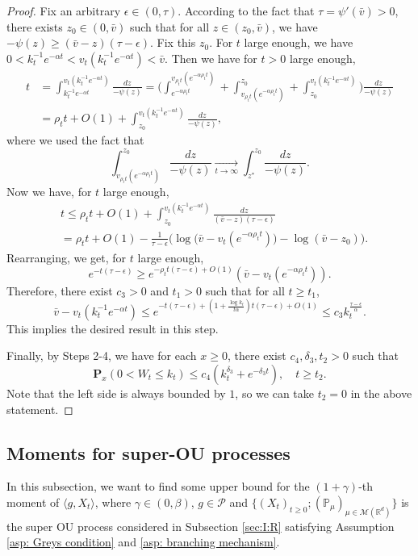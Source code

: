 \documentclass[12pt,a4paper]{amsart}
\theoremstyle{plain}
\theoremstyle{definition}
\numberwithin{equation}{section}
\begin{document}
\begin{proof}
  Fix an arbitrary $\epsilon \in (0,\tau)$.
  According to the fact that $\tau=\psi'(\bar v)>0$, there exists $z_0 \in (0,\bar v)$ such that for all $z\in (z_0, \bar v)$, we have $-\psi(z)\geq (\bar v - z)(\tau- \epsilon)$.
  Fix this $z_0$.
  For $t$ large enough, we have $0<k_t^{-1}e^{-\alpha t} < v_t(k_t^{-1}e^{-\alpha t})< \bar v$.
  Then we have for $t>0$ large enough,
  \begin{align}
    t
    & =\int^{v_t(k_t^{-1} e^{-\alpha t})}_{k_t^{-1} e^{-\alpha t}}\frac{dz}{-\psi(z)}
      = \Big(\int^{v_{\rho_t t}(e^{-\alpha \rho_t t})}_{e^{-\alpha \rho_t t}}  + \int^{z_0}_{v_{\rho_t t}(e^{-\alpha \rho_t t})} +\int^{v_t(k_t^{-1}e^{-\alpha  t})}_{z_0}\Big)\frac{dz}{-\psi(z)} \\
    & = \rho_t t + O(1) +\int^{v_t(k_t^{-1}e^{-\alpha t})}_{z_0} \frac{dz}{-\psi(z)},
  \end{align}
  where we used the fact that
  \[
    \int_{v_{\rho_t t}(e^{-\alpha \rho_tt})}^{z_0} \frac{dz}{-\psi(z)}
    \xrightarrow[t\to \infty] {} \int_{z^*}^{z_0} \frac{dz}{-\psi(z)}.
  \]
  Now we have, for $t$ large enough,
  \begin{align}
    & t
      \leq  \rho_t t + O(1) + \int_{z_0}^{v_t(k_t^{-1}e^{-\alpha t})} \frac{dz}{(\bar v-z)(\tau - \epsilon)} \\
    & =  \rho_t t +O(1)- \frac{1}{\tau-\epsilon}\Big( \log \big(\bar v-v_t(e^{-\alpha \rho_t t})\big) - \log(\bar v-z_0)\Big).
  \end{align}
  Rearranging, we get, for $t$ large enough,
  \[
    e^{-t(\tau - \epsilon)}
    \geq e^{-\rho_t t(\tau - \epsilon)+O(1)}(\bar v - v_t(e^{-\alpha \rho_t t})).
  \]
  Therefore, there exist $c_3>0$ and $t_1>0$ such that for all $t\geq t_1$,
  \[
    \bar v - v_t(k_t^{-1} e^{-\alpha t})
    \leq e^{-t(\tau -\epsilon)+ (1+\frac{\log k_t}{t\alpha})t(\tau - \epsilon)+O(1)}
    \leq c_3k_t^{\frac{\tau - \epsilon}{\alpha}}.
  \]
  This implies the desired result in this step.
  
  Finally, by Steps 2-4, we have for each $x\geq 0$, there exist $c_4, \delta_3, t_2 > 0$ such that
  \[
    \mathbf P_{x}(0< W_t\leq k_t)
    \leq c_4(k_t^{\delta_3}+e^{-\delta_3 t})
    , \quad t\geq t_2.
  \]
  Note that the left side is always bounded by $1$, so we can take $t_2 =0$ in the above statement.
\end{proof}

\subsection{Moments for super-OU processes}
\label{sec: Moments for super-OU processes}
In this subsection,  we want to find some upper bound for the $(1+\gamma)$-th moment of $\langle g ,X_t \rangle$, where $\gamma \in (0,\beta)$, $g\in \mathcal P$ and $\{(X_t)_{t\geq 0}; (\mathbb P_\mu)_{\mu \in \mathcal M(\mathbb R^d)}\}$ is the super OU process considered in Subsection \ref{sec:I:R} satisfying Assumption \ref{asp: Greys condition} and \ref{asp: branching mechanism}.
\end{document}
